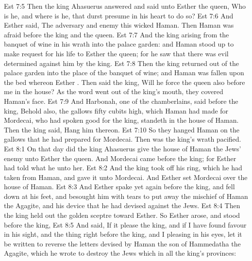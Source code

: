 \vs Est 7:5 Then the king Ahasuerus answered and said unto Esther the queen, Who is he, and where is he, that durst presume in his heart to do so?
\vs Est 7:6 And Esther said, The adversary and enemy  this wicked Haman. Then Haman was afraid before the king and the queen.
\vs Est 7:7 And the king arising from the banquet of wine in his wrath  into the palace garden: and Haman stood up to make request for his life to Esther the queen; for he saw that there was evil determined against him by the king.
\vs Est 7:8 Then the king returned out of the palace garden into the place of the banquet of wine; and Haman was fallen upon the bed whereon Esther . Then said the king, Will he force the queen also before me in the house? As the word went out of the king's mouth, they covered Haman's face.
\vs Est 7:9 And Harbonah, one of the chamberlains, said before the king, Behold also, the gallows fifty cubits high, which Haman had made for Mordecai, who had spoken good for the king, standeth in the house of Haman. Then the king said, Hang him thereon.
\vs Est 7:10 So they hanged Haman on the gallows that he had prepared for Mordecai. Then was the king's wrath pacified.
\vs Est 8:1 On that day did the king Ahasuerus give the house of Haman the Jews' enemy unto Esther the queen. And Mordecai came before the king; for Esther had told what he  unto her.
\vs Est 8:2 And the king took off his ring, which he had taken from Haman, and gave it unto Mordecai. And Esther set Mordecai over the house of Haman.
\vs Est 8:3 And Esther spake yet again before the king, and fell down at his feet, and besought him with tears to put away the mischief of Haman the Agagite, and his device that he had devised against the Jews.
\vs Est 8:4 Then the king held out the golden sceptre toward Esther. So Esther arose, and stood before the king,
\vs Est 8:5 And said, If it please the king, and if I have found favour in his sight, and the thing  right before the king, and I  pleasing in his eyes, let it be written to reverse the letters devised by Haman the son of Hammedatha the Agagite, which he wrote to destroy the Jews which  in all the king's provinces:
